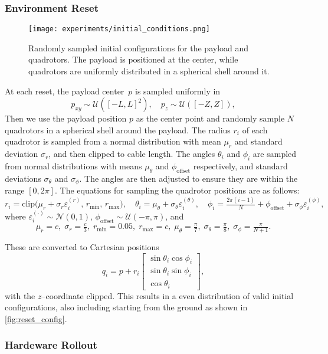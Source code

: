 \subsubsection{Environment Reset}
\label{sec:reset}
\begin{figure}
    \centering
    \texttt{[image: experiments/initial\_conditions.png]}
    \caption{Randomly sampled initial configurations for the payload and quadrotors. The payload is positioned at the center, while quadrotors are uniformly distributed in a spherical shell around it.}
    \label{fig:reset_config}
\end{figure}
At each reset, the payload center~$p$ is sampled uniformly in
\[
p_{xy}\sim\mathcal{U}([-L,L]^2),\quad p_z\sim\mathcal{U}([-Z,Z]),
\]
Then we use the payload position $p$ as the center point and randomly sample $N$ quadrotors in a spherical shell around the payload. The radius $r_i$ of each quadrotor is sampled from a normal distribution with mean $\mu_r$ and standard deviation $\sigma_r$, and then clipped to cable length. The angles $\theta_i$ and $\phi_i$ are sampled from normal distributions with means $\mu_\theta$ and $\phi_{\mathrm{offset}}$ respectively, and standard deviations $\sigma_\theta$ and $\sigma_\phi$. The angles are then adjusted to ensure they are within the range $[0, 2\pi]$. The equations for sampling the quadrotor positions are as follows:
\[
r_i = \mathrm{clip}\bigl(\mu_r+\sigma_r\varepsilon_i^{(r)},\,r_{\min},\,r_{\max}\bigr),\quad
\theta_i = \mu_\theta+\sigma_\theta\varepsilon_i^{(\theta)},\quad
\phi_i = \tfrac{2\pi(i-1)}{N} + \phi_{\mathrm{offset}} + \sigma_\phi\varepsilon_i^{(\phi)},
\]
where $\varepsilon_i^{(\cdot)}\!\sim\mathcal{N}(0,1)$, $\phi_{\mathrm{offset}}\!\sim\mathcal{U}(-\pi,\pi)$, and
\[
\mu_r=c,\;\sigma_r=\tfrac{c}{3},\;r_{\min}=0.05,\;r_{\max}=c,\;
\mu_\theta=\tfrac{\pi}{7},\;\sigma_\theta=\tfrac{\pi}{8},\;\sigma_\phi=\tfrac{\pi}{N+1}.
\]

These are converted to Cartesian positions
\[
q_i = p + r_i
\begin{bmatrix}
\sin\theta_i\cos\phi_i\\
\sin\theta_i\sin\phi_i\\
\cos\theta_i
\end{bmatrix},
\]
with the $z$–coordinate clipped. 
This results in a even distribution of valid initial configurations, also including starting from the ground as shown in \autoref{fig:reset_config}. 



\subsubsection{Hardeware Rollout}




